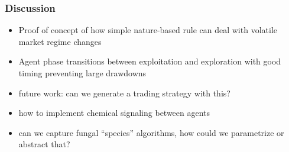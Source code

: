 \documentclass[10pt]{beamer}
\begin{document}
		\begin{frame}
			\frametitle{Discussion}
			\begin{itemize}
				\item Proof of concept of how simple nature-based rule can deal with volatile market regime changes
				\item Agent phase transitions between exploitation and exploration with good timing preventing large drawdowns
				\item future work: can we generate a trading strategy with this?
				\item how to implement chemical signaling between agents
				\item can we capture fungal ``species'' algorithms, how could we parametrize or abstract that?
			\end{itemize}
		\end{frame}

	
	
	
\end{document}
